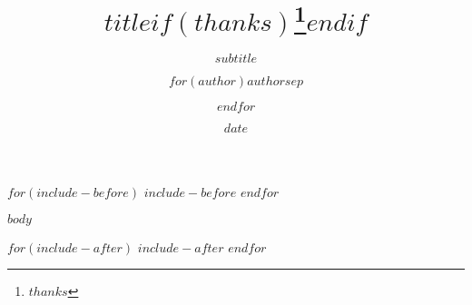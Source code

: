 \documentclass[12pt,letterpaper]{report}
\title{$title$$if(thanks)$\thanks{$thanks$}$endif$}
\subtitle{$subtitle$}
\author{$for(author)$$author$$sep$ \and $endfor$}
\date{$date$}
\begin{document}
$for(include-before)$
$include-before$
$endfor$

$body$

$for(include-after)$
$include-after$
$endfor$
\end{document}
